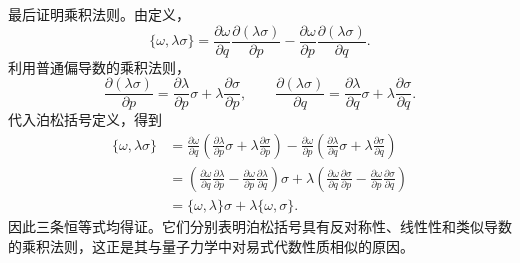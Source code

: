 \begin{solution}[泊松括号]
最后证明乘积法则。由定义，
\[
\{\omega,\lambda\sigma\}
=
\frac{\partial \omega}{\partial q}\frac{\partial(\lambda\sigma)}{\partial p}
-
\frac{\partial \omega}{\partial p}\frac{\partial(\lambda\sigma)}{\partial q}.
\]
利用普通偏导数的乘积法则，
\[
\frac{\partial(\lambda\sigma)}{\partial p}
=
\frac{\partial\lambda}{\partial p}\sigma
+
\lambda\frac{\partial\sigma}{\partial p},
\qquad
\frac{\partial(\lambda\sigma)}{\partial q}
=
\frac{\partial\lambda}{\partial q}\sigma
+
\lambda\frac{\partial\sigma}{\partial q}.
\]
代入泊松括号定义，得到
\[
\begin{aligned}
\{\omega,\lambda\sigma\}
&=
\frac{\partial \omega}{\partial q}
\left(
\frac{\partial\lambda}{\partial p}\sigma
+
\lambda\frac{\partial\sigma}{\partial p}
\right)
-
\frac{\partial \omega}{\partial p}
\left(
\frac{\partial\lambda}{\partial q}\sigma
+
\lambda\frac{\partial\sigma}{\partial q}
\right)\\
&=
\left(
\frac{\partial \omega}{\partial q}\frac{\partial\lambda}{\partial p}
-
\frac{\partial \omega}{\partial p}\frac{\partial\lambda}{\partial q}
\right)\sigma
+
\lambda
\left(
\frac{\partial \omega}{\partial q}\frac{\partial\sigma}{\partial p}
-
\frac{\partial \omega}{\partial p}\frac{\partial\sigma}{\partial q}
\right)\\
&=
\{\omega,\lambda\}\sigma+\lambda\{\omega,\sigma\}.
\end{aligned}
\]
因此三条恒等式均得证。它们分别表明泊松括号具有反对称性、线性性和类似导数的乘积法则，这正是其与量子力学中对易式代数性质相似的原因。
\end{solution}


